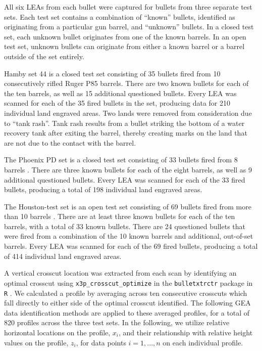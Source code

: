 \documentclass[12pt]{article}
\begin{document}
All six LEAs from each bullet were captured for bullets from three
separate test sets. Each test set contains a combination of ``known''
bullets, identified as originating from a particular gun barrel, and
``unknown'' bullets. In a closed test set, each unknown bullet
originates from one of the known barrels. In an open test set, unknown
bullets can originate from either a known barrel or a barrel outside of
the set entirely.

Hamby set 44 is a closed test set consisting of 35 bullets fired from 10
consecutively rifled Ruger P85 barrels. There are two known bullets for
each of the ten barrels, as well as 15 additional questioned bullets.
Every LEA was scanned for each of the 35 fired bullets in the set,
producing data for 210 individual land engraved areas. Two lands
{\color{teal}{-- Barrel 9, Bullet 2, Land 3 and Unknowns, Bullet L, Land 5 -- - remove?}}
were removed from consideration due to ``tank rash''. Tank rash results
from a bullet striking the bottom of a water recovery tank after exiting
the barrel, thereby creating marks on the land that are not due to the
contact with the barrel.

The Phoenix PD set is a closed test set consisting of 33 bullets fired
from 8 barrels {\color{teal}{more information on the type of barrels?}}.
There are three known bullets for each of the eight barrels, as well as
9 additional questioned bullets. Every LEA was scanned for each of the
33 fired bullets, producing a total of 198 individual land engraved
areas.

The Houston-test set is an open test set consisting of 69 bullets fired
from more than 10 barrels
{\color{teal}{more information on the type of barrels?}}. There are at
least three known bullets for each of the ten barrels, with a total of
33 known bullets. There are 24 questioned bullets that were fired from a
combination of the 10 known barrels and additional, out-of-set barrels.
Every LEA was scanned for each of the 69 fired bullets, producing a
total of 414 individual land engraved areas.

A vertical crosscut location was extracted from each scan by identifying
an optimal crosscut using \texttt{x3p\_crosscut\_optimize} in the
\texttt{bulletxtrctr} package in \texttt{R} \cite{bulletxtrctr}. We
calculated a profile by averaging across ten consecutive crosscuts which
fall directly to either side of the optimal crosscut identified. The
following GEA data identification methods are applied to these averaged
profiles, for a total of 820 profiles across the three test sets. In the
following, we utilize relative horizontal locations on the profile,
\(x_i\), and their relationship with relative height values on the
profile, \(z_i\), for data points \(i = 1, ..., n\) on each individual
profile.
\end{document}
